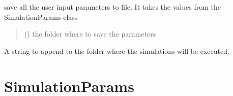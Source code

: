 \documentclass[letterpaper,10pt,english]{sphinxmanual}
\begin{document}
\begin{fulllineitems}

\begin{fulllineitems}
\label{\detokenize{index:raypyng.simulate.Simulate.save_parameters_to_file}}
\pysigstartsignatures
{}
\pysigstopsignatures
\sphinxAtStartPar
save all the user input parameters to file. It takes the values
from the SimulationParams class
\begin{quote}\begin{description}
\sphinxAtStartPar
{} () \textendash{} the folder where to save the parameters

\end{description}\end{quote}

\end{fulllineitems}


\begin{fulllineitems}
\label{\detokenize{index:raypyng.simulate.Simulate.simulation_name}}
\pysigstartsignatures
{}
\pysigstopsignatures
\sphinxAtStartPar
A string to append to the folder where the simulations will be executed.

\end{fulllineitems}


\end{fulllineitems}



\chapter{SimulationParams}
\label{\detokenize{index:simulationparams}}
\end{document}
